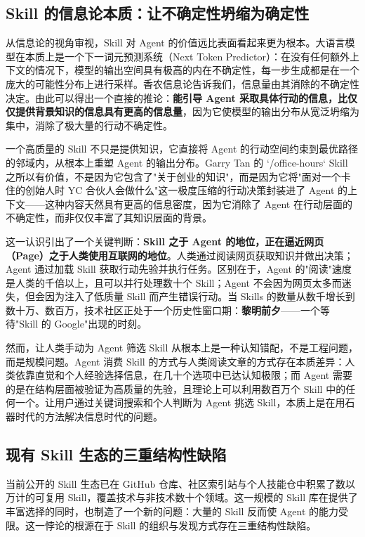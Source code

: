 \subsection{Skill 的信息论本质：让不确定性坍缩为确定性}

从信息论的视角审视\cite{shannon1948communication}，Skill 对 Agent 的价值远比表面看起来更为根本。大语言模型在本质上是一个下一词元预测系统（Next Token Predictor）\cite{brown2020gpt3}：在没有任何额外上下文的情况下，模型的输出空间具有极高的内在不确定性，每一步生成都是在一个庞大的可能性分布上进行采样。香农信息论告诉我们，信息量由其消除的不确定性决定。由此可以得出一个直接的推论：\textbf{能引导 Agent 采取具体行动的信息，比仅仅提供背景知识的信息具有更高的信息量}，因为它使模型的输出分布从宽泛坍缩为集中，消除了极大量的行动不确定性。

一个高质量的 Skill 不只是提供知识，它直接将 Agent 的行动空间约束到最优路径的邻域内，从根本上重塑 Agent 的输出分布。Garry Tan 的 `/office-hours` Skill 之所以有价值，不是因为它包含了"关于创业的知识"，而是因为它将"面对一个卡住的创始人时 YC 合伙人会做什么"这一极度压缩的行动决策封装进了 Agent 的上下文——这种内容天然具有更高的信息密度，因为它消除了 Agent 在行动层面的不确定性，而非仅仅丰富了其知识层面的背景。

这一认识引出了一个关键判断：\textbf{Skill 之于 Agent 的地位，正在逼近网页（Page）之于人类使用互联网的地位}。人类通过阅读网页获取知识并做出决策；Agent 通过加载 Skill 获取行动先验并执行任务。区别在于，Agent 的"阅读"速度是人类的千倍以上，且可以并行处理数十个 Skill；Agent 不会因为网页太多而迷失，但会因为注入了低质量 Skill 而产生错误行动。当 Skills 的数量从数千增长到数十万、数百万，技术社区正处于一个历史性窗口期：\textbf{黎明前夕}——一个等待"Skill 的 Google"出现的时刻。

然而，让人类手动为 Agent 筛选 Skill 从根本上是一种认知错配，不是工程问题，而是规模问题。Agent 消费 Skill 的方式与人类阅读文章的方式存在本质差异\cite{liu2024lostinthemiddle}：人类依靠直觉和个人经验选择信息，在几十个选项中已达认知极限；而 Agent 需要的是在结构层面被验证为高质量的先验，且理论上可以利用数百万个 Skill 中的任何一个。让用户通过关键词搜索和个人判断为 Agent 挑选 Skill，本质上是在用石器时代的方法解决信息时代的问题。

\subsection{现有 Skill 生态的三重结构性缺陷}

当前公开的 Skill 生态已在 GitHub 仓库、社区索引站与个人技能仓中积累了数以万计的可复用 Skill，覆盖技术与非技术数十个领域。这一规模的 Skill 库在提供了丰富选择的同时，也制造了一个新的问题：大量的 Skill 反而使 Agent 的能力受限。这一悖论的根源在于 Skill 的组织与发现方式存在三重结构性缺陷。

